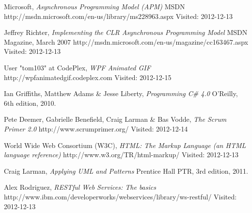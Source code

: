 
\begin{thebibliography}{99}

		Microsoft,
		\emph{Asynchronous Programming Model (APM)}\newline
		MSDN\newline
		http://msdn.microsoft.com/en-us/library/ms228963.aspx\newline
		Visited: 2012-12-13
	
		Jeffrey Richter,
		\emph{Implementing the CLR Asynchronous Programming Model}\newline
		MSDN Magazine,
		March 2007\newline
		http://msdn.microsoft.com/en-us/magazine/cc163467.aspx\newline
		Visited: 2012-12-13

		User "tom103" at CodePlex,
		\emph{WPF Animated GIF}\newline
		http://wpfanimatedgif.codeplex.com\newline
		Visited: 2012-12-15

		Ian Griffiths, Matthew Adams \& Jesse Liberty,
		\emph{Programming C\# 4.0}\newline
		O'Reilly, 6th edition, 2010.

		Pete Deemer, Gabrielle Benefield, Craig Larman \& Bas Vodde,
		\emph{The Scrum Primer 2.0}\newline
		http://www.scrumprimer.org/\newline
		Visited: 2012-12-14

		World Wide Web Consortium (W3C),
		\emph{HTML: The Markup Language (an HTML language reference)}\newline
		http://www.w3.org/TR/html-markup/\newline
		Visited: 2012-12-13
        
        Craig Larman,
        \emph{Applying UML and Patterns}\newline
        Prentice Hall PTR, 3rd edition, 2011.
        
        Alex Rodriguez,
        \emph{RESTful Web Services: The basics}\newline
        http://www.ibm.com/developerworks/webservices/library/ws-restful/\newline
        Visited: 2012-12-13
        

\end{thebibliography}
